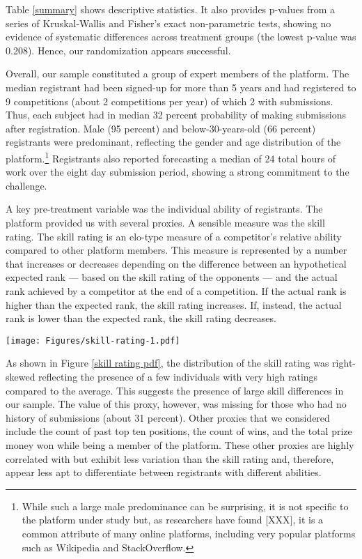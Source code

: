 \documentclass[11pt, titlepage]{article}
\begin{document}
Table \ref{summary} shows descriptive statistics. It also provides
p-values from a series of Kruskal-Wallis and Fisher's exact
non-parametric tests, showing no evidence of systematic differences
across treatment groups (the lowest p-value was 0.208). Hence, our
randomization appears successful.

Overall, our sample constituted a group of expert members of the
platform. The median registrant had been signed-up for more than 5 years
and had registered to 9 competitions (about 2 competitions per year) of
which 2 with submissions. Thus, each subject had in median 32 percent
probability of making submissions after registration. Male (95 percent)
and below-30-years-old (66 percent) registrants were predominant,
reflecting the gender and age distribution of the platform.\footnote{While
  such a large male predominance can be surprising, it is not specific
  to the platform under study but, as researchers have found {[}XXX{]},
  it is a common attribute of many online platforms, including very
  popular platforms such as Wikipedia and StackOverflow.} Registrants
also reported forecasting a median of 24 total hours of work over the
eight day submission period, showing a strong commitment to the
challenge.

A key pre-treatment variable was the individual ability of registrants.
The platform provided us with several proxies. A sensible measure was
the skill rating. The skill rating is an elo-type measure of a
competitor's relative ability compared to other platform members. This
measure is represented by a number that increases or decreases depending
on the difference between an hypothetical expected rank --- based on the
skill rating of the opponents --- and the actual rank achieved by a
competitor at the end of a competition. If the actual rank is higher
than the expected rank, the skill rating increases. If, instead, the
actual rank is lower than the expected rank, the skill rating decreases.

\texttt{[image: Figures/skill-rating-1.pdf]}

As shown in Figure \ref{skill rating pdf}, the distribution of the skill
rating was right-skewed reflecting the presence of a few individuals
with very high ratings compared to the average. This suggests the
presence of large skill differences in our sample. The value of this
proxy, however, was missing for those who had no history of submissions
(about 31 percent). Other proxies that we considered include the count
of past top ten positions, the count of wins, and the total prize money
won while being a member of the platform. These other proxies are highly
correlated with but exhibit less variation than the skill rating and,
therefore, appear less apt to differentiate between registrants with
different abilities.
\end{document}
